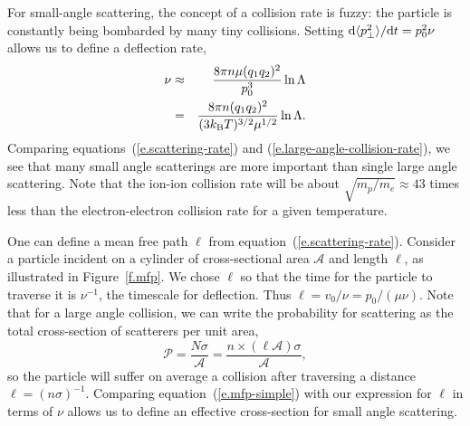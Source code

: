 For small-angle scattering, the concept of a collision rate is fuzzy: the particle is constantly being bombarded by many tiny collisions.  Setting $\mathrm{d} \langle p_{\bot}^{2}\rangle/\mathrm{d} t = p_{0}^{2}\nu$ allows us to define a deflection rate,
\begin{eqnarray}\label{e.scattering-rate}
\nu &\approx& \frac{8\pi n \mu (q_{1}q_{2})^{2}}{p_{0}^{3}} \ln\Lambda\\
 &=& \frac{8\pi n (q_{1}q_{2})^{2}}{(3k_\mathrm{B} T)^{3/2}\mu^{1/2}}\ln\Lambda.
\end{eqnarray}
Comparing equations~(\ref{e.scattering-rate}) and (\ref{e.large-angle-collision-rate}), we see that many small angle scatterings are more important than single large angle scattering. Note that the ion-ion collision rate will be about $\sqrt{m_{p}/m_{e}} \approx 43$ times less than the electron-electron collision rate for a given temperature.

One can define a mean free path $\ell$ from equation~(\ref{e.scattering-rate}). Consider a particle incident on a cylinder of cross-sectional area $\mathcal{A}$ and length $\ell$, as illustrated in Figure~\ref{f.mfp}. We chose $\ell$ so that the time for the particle to traverse it is $\nu^{-1}$, the timescale for deflection.  Thus $\ell = v_{0}/\nu = p_{0}/(\mu\nu)$. Note that for a large angle collision, we can write the probability for scattering as the total cross-section of scatterers per unit area,
\begin{equation}\label{e.mfp-simple}
\mathcal{P} = \frac{N\sigma}{\mathcal{A}} = \frac{n\times(\ell\mathcal{A})\sigma}{\mathcal{A}},
\end{equation}
so the particle will suffer on average a collision after traversing a distance $\ell = (n\sigma)^{-1}$. Comparing equation~(\ref{e.mfp-simple}) with our expression for $\ell$ in terms of $\nu$ allows us to define an effective cross-section for small angle scattering.

